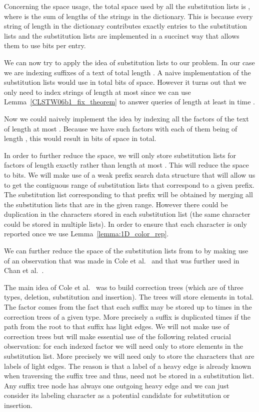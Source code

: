 \documentclass{article}
\newcommand{\?}{\mskip1.5mu}
\begin{document}
Concerning the space usage, the total space used by all the substitution lists is , where  is the sum of lengths of the strings in the dictionary. This is because every string of length  in the dictionary  contributes exactly  entries to the substitution lists and the substitution lists are implemented in a succinct way that allows them to use  bits per entry. 

We can now try to apply the idea of substitution lists to our problem. In our case we are indexing suffixes of a text of total length . A naive implementation of the substitution lists would use in total  bits of space. 
However it turns out that we only need to index strings of length at most  since we can use Lemma~\ref{CLSTW06b1_fix_theorem} to answer queries of length at least  in time . 


Now we could naively implement the idea by indexing all the factors of the text of length at most . Because we have  such factors with each of them being of length , this would result in  bits of space in total.

In order to further reduce the space, we will only store substitution lists for factors of length exactly  rather than length at most . This will reduce the space to  bits. We will make use of a weak prefix search data structure that will allow us to get the contiguous range of substitution lists that correspond to a given prefix. The substitution list corresponding to that prefix will be obtained by merging all the substitution lists that are in the given range. 
However there could be duplication in the characters stored in each substitution list (the same character could be stored in multiple lists). In order to ensure that each character is only reported once we use Lemma~\ref{lemma:1D_color_rep}. 

We can further reduce the space of the substitution lists from  to  by making use of an observation that was made in Cole et al.~\cite{CGL04} and that was further used in Chan et al.~\cite{CLSTW10}. 

The main idea of Cole et al.~\cite{CGL04} was to build correction trees (which are of three types, deletion, substitution and insertion). The trees will store  elements in total. The  factor comes from the fact that each suffix may be stored up to  times in the correction trees of a given type. More precisely a suffix is duplicated  times if the path from the root to that suffix has  light edges. We will not make use of correction trees but will make essential use of the following related crucial observation: for each indexed factor we will need only to store  elements in the substitution list. More precisely we will need only to store the characters that are labels of light edges. The reason is that a label of a heavy edge is already known when traversing the suffix tree and thus, need not be stored in a substitution list. Any suffix tree node has always one outgoing heavy edge and we can just consider its labeling character as a potential candidate for substitution or insertion. 
\end{document}

